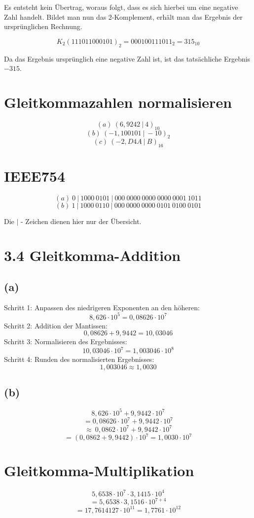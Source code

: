 \documentclass{article}
\begin{document}
Es entsteht kein Übertrag, woraus folgt, dass es sich hierbei um eine negative Zahl handelt. Bildet man nun das 2-Komplement, erhält man das Ergebnis der ursprünglichen Rechnung.

\[ K_2(111011000101)_2=000100111011_2 = 315_{10} \]

Da das Ergebnis ursprünglich eine negative Zahl ist, ist das tatsächliche Ergebnis $-315$.

\section{Gleitkommazahlen normalisieren}
\[(a)\ (6,9242\ |\ 4)_{10}\]
\[(b)\ (-1,100101\ |\ -10)_2\]
\[(c)\ (-2,D4A\ |\ B)_{16}\]

\section{IEEE754}
\[(a)\ 0\ |\ 1000\ 0101\ |\ 000\ 0000\ 0000\ 0000\ 0001\ 1011 \]
\[(b)\ 1\ |\ 1000\ 0110\ |\ 000\ 0000\ 0000\ 0101\ 0100\ 0101 \]

Die \(|\) - Zeichen dienen hier nur der Übersicht.

\section*{3.4 Gleitkomma-Addition}
\subsection*{(a)}
Schritt 1: Anpassen des niedrigeren Exponenten an den höheren:
\[8,626 \cdot 10^5 = 0,08626 \cdot 10^7 \]
Schritt 2: Addition der Mantissen:
\[0,08626 + 9,9442 = 10,03046\]
Schritt 3: Normalisieren des Ergebnisses:
\[10,03046 \cdot 10^7 = 1,003046 \cdot 10^8\]
Schritt 4: Runden des normalisierten Ergebnisses:
\[1,003046 \approx 1,0030 \]

\subsection*{(b)}
\[ 8,626 \cdot 10^5 +9,9442 \cdot 10^7 \]
\[ = 0,08626 \cdot 10^7 +9,9442 \cdot 10^7 \]
\[ \approx \ 0,0862 \cdot 10^7+9,9442 \cdot 10^7 \]
\[ = (0,0862 + 9,9442) \cdot 10^7 = 1,0030 \cdot 10^7 \]


\section{Gleitkomma-Multiplikation}
\[ 5,6538 \cdot 10^7 \cdot 3,1415 \cdot 10^4 \]
\[ = 5,6538 \cdot 3,1516 \cdot 10^{7+4} \]
\[ = 17,7614127 \cdot 10^{11}=1,7761\cdot 10^{12} \]
\end{document}
